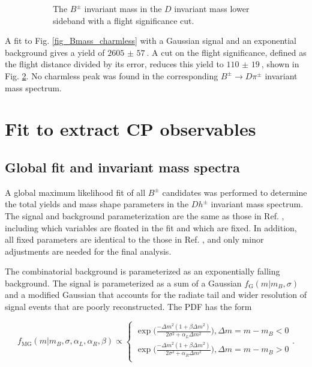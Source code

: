 \documentclass[12pt, a4paper, notitlepage, onecolumn]{article}
\numberwithin{equation}{section}
\begin{document}
\begin{figure}[H]
\begin{subfigure}{0.5\textwidth}
    \caption{The $B^\pm$ invariant mass in the $D$ invariant mass lower sideband with a flight significance cut.}
    \label{fig_Bmass_charmless_fdcut}
  \end{subfigure}
  \caption{}
\end{figure}

A fit to Fig. \ref{fig_Bmass_charmless} with a Gaussian signal and an exponential background gives a yield of $\SI{2605(57)}{}$. A cut on the flight significance, defined as the flight distance divided by its error, reduces this yield to $\SI{110(19)}{}$, shown in Fig. \ref{fig_Bmass_charmless_fdcut}. No charmless peak was found in the corresponding $B^\pm\to D\pi^\pm$ invariant mass spectrum.

\section{Fit to extract CP observables}
\subsection{Global fit and invariant mass spectra}
\label{section_global_fit}
\noindent A global maximum likelihood fit of all $B^\pm$ candidates was performed to determine the total yields and mass shape parameters in the $Dh^\pm$ invariant mass spectrum. The signal and background parameterization are the same as those in Ref. \cite{cite_LHCbGGSZKSpipi}, including which variables are floated in the fit and which are fixed. In addition, all fixed parameters are identical to the those in Ref. \cite{cite_LHCbGGSZKSpipi}, and only minor adjustments are needed for the final analysis.

The combinatorial background is parameterized as an exponentially falling background. The signal is parameterized as a sum of a Gaussian $f_\text{G}(m|m_B, \sigma)$ and a modified Gaussian that accounts for the radiate tail and wider resolution of signal events that are poorly reconstructed. The PDF has the form

\begin{equation}
  f_\text{MG}(m|m_B, \sigma, \alpha_L, \alpha_R, \beta)\propto
  \begin{cases}
    \exp\Big(\frac{-\Delta m^2(1 + \beta\Delta m^2)}{2\sigma^2 + \alpha_L\Delta m^2}\Big), \Delta m = m - m_B < 0 \\
    \exp\Big(\frac{-\Delta m^2(1 + \beta\Delta m^2)}{2\sigma^2 + \alpha_R\Delta m^2}\Big), \Delta m = m - m_B > 0 \\
  \end{cases}.
\end{equation}
\end{document}
